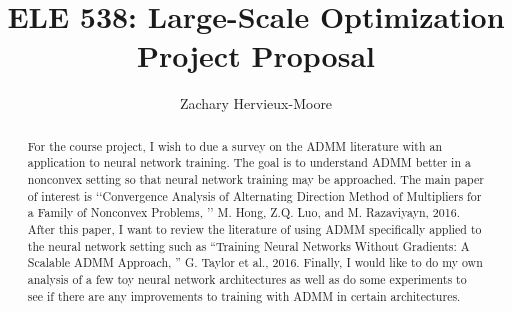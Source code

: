 \documentclass[12pt]{article}
\title{ELE 538: Large-Scale Optimization \\ Project Proposal}
\author{Zachary Hervieux-Moore}
\date{\displaydate{date}}
\theoremstyle{colon}
\begin{document}
\maketitle

\begin{abstract}
	For the course project, I wish to due a survey on the ADMM literature with an application to neural network training. The goal is to understand ADMM better in a nonconvex setting so that neural network training may be approached. The main paper of interest is ‘‘Convergence Analysis of Alternating Direction Method of Multipliers for a Family of Nonconvex Problems, ’’ M. Hong, Z.Q. Luo, and M. Razaviyayn, 2016. After this paper, I want to review the literature of using ADMM specifically applied to the neural network setting such as ``Training Neural Networks Without Gradients: A Scalable ADMM Approach, '' G. Taylor et al., 2016. Finally, I would like to do my own analysis of a few toy neural network architectures as well as do some experiments to see if there are any improvements to training with ADMM in certain architectures.
\end{abstract}
\end{document}
